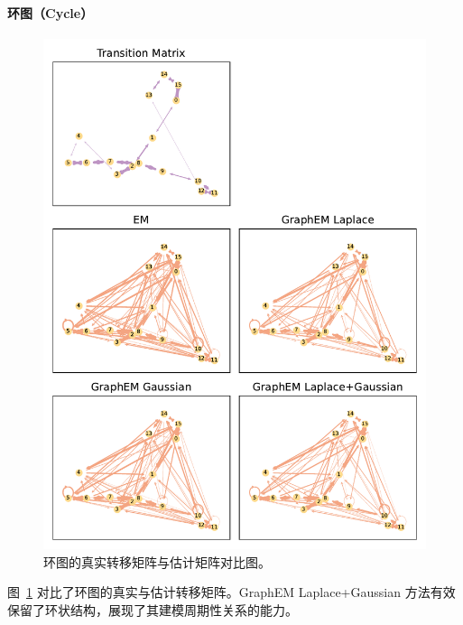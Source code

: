 \paragraph*{环图（Cycle）}
\begin{figure}[tb]
    \centering
    \includegraphics[width=0.75\linewidth]{fig/cycle/graphs_for_true_and_EM.pdf}
    \caption{环图的真实转移矩阵与估计矩阵对比图。}
    \label{fig: cycle graph comparison}
\end{figure}

图~\ref{fig: cycle graph comparison} 对比了环图的真实与估计转移矩阵。GraphEM Laplace+Gaussian 方法有效保留了环状结构，展现了其建模周期性关系的能力。

